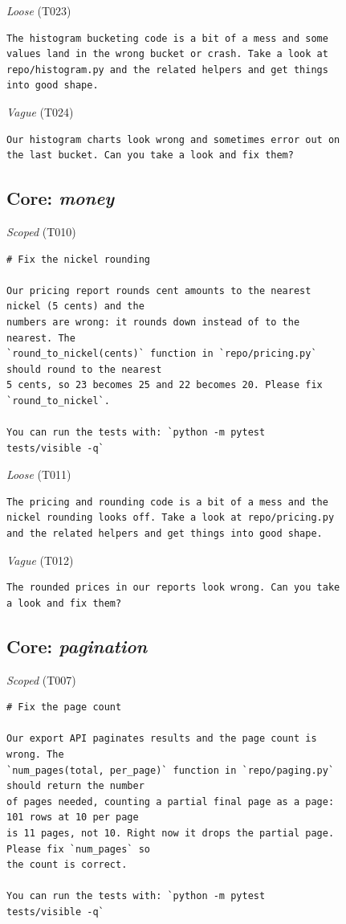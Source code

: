 \noindent\textit{Loose} (T023)
\begin{Verbatim}[fontsize=\scriptsize,frame=leftline,xleftmargin=0.5em]
The histogram bucketing code is a bit of a mess and some
values land in the wrong bucket or crash. Take a look at
repo/histogram.py and the related helpers and get things
into good shape.
\end{Verbatim}

\noindent\textit{Vague} (T024)
\begin{Verbatim}[fontsize=\scriptsize,frame=leftline,xleftmargin=0.5em]
Our histogram charts look wrong and sometimes error out on
the last bucket. Can you take a look and fix them?
\end{Verbatim}

\subsection*{Core: \emph{money}}
\noindent\textit{Scoped} (T010)
\begin{Verbatim}[fontsize=\scriptsize,frame=leftline,xleftmargin=0.5em]
# Fix the nickel rounding

Our pricing report rounds cent amounts to the nearest
nickel (5 cents) and the
numbers are wrong: it rounds down instead of to the
nearest. The
`round_to_nickel(cents)` function in `repo/pricing.py`
should round to the nearest
5 cents, so 23 becomes 25 and 22 becomes 20. Please fix
`round_to_nickel`.

You can run the tests with: `python -m pytest
tests/visible -q`
\end{Verbatim}

\noindent\textit{Loose} (T011)
\begin{Verbatim}[fontsize=\scriptsize,frame=leftline,xleftmargin=0.5em]
The pricing and rounding code is a bit of a mess and the
nickel rounding looks off. Take a look at repo/pricing.py
and the related helpers and get things into good shape.
\end{Verbatim}

\noindent\textit{Vague} (T012)
\begin{Verbatim}[fontsize=\scriptsize,frame=leftline,xleftmargin=0.5em]
The rounded prices in our reports look wrong. Can you take
a look and fix them?
\end{Verbatim}

\subsection*{Core: \emph{pagination}}
\noindent\textit{Scoped} (T007)
\begin{Verbatim}[fontsize=\scriptsize,frame=leftline,xleftmargin=0.5em]
# Fix the page count

Our export API paginates results and the page count is
wrong. The
`num_pages(total, per_page)` function in `repo/paging.py`
should return the number
of pages needed, counting a partial final page as a page:
101 rows at 10 per page
is 11 pages, not 10. Right now it drops the partial page.
Please fix `num_pages` so
the count is correct.

You can run the tests with: `python -m pytest
tests/visible -q`
\end{Verbatim}

